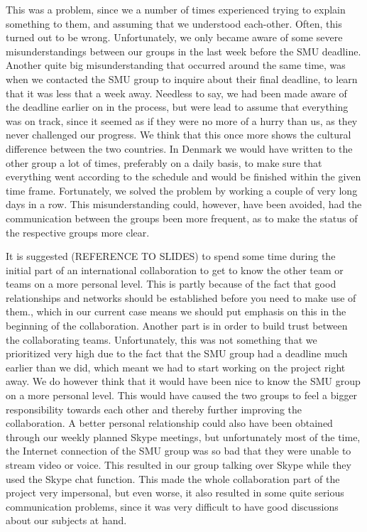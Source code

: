 This was a problem, since we a number of times experienced trying to explain something to them, and assuming that we understood each-other. Often, this turned out to be wrong. Unfortunately, we only became aware of some severe misunderstandings between our groups in the last week before the SMU deadline. Another quite big misunderstanding that occurred around the same time, was when we contacted the SMU group to inquire about their final deadline, to learn that it was less that a week away. Needless to say, we had been made aware of the deadline earlier on in the process, but were lead to assume that everything was on track, since it seemed as if they were no more of a hurry than us, as they never challenged our progress. We think that this once more shows the cultural difference between the two countries. In Denmark we would have written to the other group a lot of times, preferably on a daily basis, to make sure that everything went according to the schedule and would be finished within the given time frame. Fortunately, we solved the problem by working a couple of very long days in a row. This misunderstanding could, however, have been avoided, had the communication between the groups been more frequent, as to make the status of the respective groups more clear.

It is suggested (REFERENCE TO SLIDES) to spend some time during the initial part of an international collaboration to get to know the other team or teams on a more personal level. This is partly because of the fact that good relationships and networks should be established before you need to make use of them., which in our current case means we should put emphasis on this in the beginning of the collaboration. Another part is in order to build trust between the collaborating teams. Unfortunately, this was not something that we prioritized very high due to the fact that the SMU group had a deadline much earlier than we did, which meant we had to start working on the project right away. We do however think that it would have been nice to know the SMU group on a more personal level. This would have caused the two groups to feel a bigger responsibility towards each other and thereby further improving the collaboration. A better personal relationship could also have been obtained through our weekly planned Skype meetings, but unfortunately most of the time, the Internet connection of the SMU group was so bad that they were unable to stream video or voice. This resulted in our group talking over Skype while they used the Skype chat function. This made the whole collaboration part of the project very impersonal, but even worse, it also resulted in some quite serious communication problems, since it was very difficult to have good discussions about our subjects at hand.


